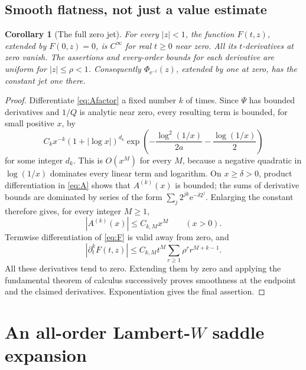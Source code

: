 \documentclass[11pt,oneside]{article}
\numberwithin{equation}{section}
\newtheorem{corollary}[theorem]{Corollary}
\theoremstyle{definition}
\theoremstyle{remark}
\newcommand{\e}{\mathrm e}
\begin{document}
\subsection{Smooth flatness, not just a value estimate}
\begin{corollary}[The full zero jet]
\label{cor:smoothflat}
For every \(|z|<1\), the function \(F(t,z)\), extended by \(F(0,z)=0\), is
\(C^\infty\) for real \(t\ge0\) near zero. All its \(t\)-derivatives at zero
vanish. The assertions and every-order bounds for each derivative are uniform
for \(|z|\le\rho<1\). Consequently \(\Phi_{\e^{-t}}(z)\), extended by one at
zero, has the constant jet one there.
\end{corollary}
\begin{proof}
Differentiate \eqref{eq:Afactor} a fixed number \(k\) of times. Since
\(\Psi\) has bounded derivatives and \(1/Q\) is analytic near zero, every
resulting term is bounded, for small positive \(x\), by
\[
 C_k x^{-k}(1+|\log x|)^{d_k}
       \exp\left(-\frac{\log^2(1/x)}{2a}-\frac{\log(1/x)}2\right)
\]
for some integer \(d_k\). This is \(O(x^M)\) for every \(M\), because a
negative quadratic in \(\log(1/x)\) dominates every linear term and logarithm.
On \(x\ge\delta>0\), product differentiation in \eqref{eq:A} shows that
\(A^{(k)}(x)\) is bounded; the sums of derivative bounds are dominated by
series of the form \(\sum_j2^{jk}\e^{-\delta2^j}\). Enlarging the constant
therefore gives, for every integer \(M\ge1\),
\[
 |A^{(k)}(x)|\le C_{k,M}x^M\qquad(x>0).
\]
Termwise differentiation of \eqref{eq:F} is valid away from zero, and
\[
 |\partial_t^kF(t,z)|\le C_{k,M}t^M
                 \sum_{r\ge1}\rho^r r^{M+k-1}.
\]
All these derivatives tend to zero. Extending them by zero and applying the
fundamental theorem of calculus successively proves smoothness at the endpoint
and the claimed derivatives. Exponentiation gives the final assertion.
\end{proof}

\section{An all-order Lambert-\texorpdfstring{\(W\)}{W} saddle expansion}
\label{sec:saddle}
\end{document}
